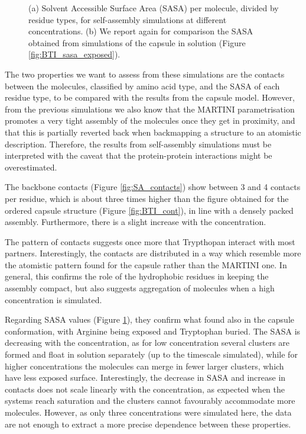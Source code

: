 \begin{figure}
\caption[Self-assembly simulations: SASA]{(a) Solvent Accessible Surface Area (SASA) per molecule, divided by residue types, for self-assembly simulations at different concentrations. (b) We report again for comparison the SASA obtained from simulations of the capsule in solution (Figure \ref{fig:BTI_sasa_exposed}).}
\label{fig:SA_sasa_all}
\end{figure}

The two properties we want to assess from these simulations are the contacts between the molecules, classified by amino acid type, and the SASA of each residue type, to be compared with the results from the capsule model. However, from the previous simulations we also know that the MARTINI parametrisation promotes a very tight assembly of the molecules once they get in proximity, and that this is partially reverted back when backmapping a structure to an atomistic description. Therefore, the results from self-assembly simulations must be interpreted with the caveat that the protein-protein interactions might be overestimated.

The backbone contacts (Figure \ref{fig:SA_contacts}) show between 3 and 4 contacts per residue, which is about three times higher than the figure obtained for the ordered capsule structure (Figure \ref{fig:BTI_cont}), in line with a densely packed assembly.
%
Furthermore, there is a slight increase with the concentration.

The pattern of contacts suggests once more that Trypthopan interact with most partners. Interestingly, the contacts are distributed in a way which resemble more the atomistic pattern found for the capsule rather than the MARTINI one. In general, this confirms the role of the hydrophobic residues in keeping the assembly compact, but also suggests aggregation of molecules when a high concentration is simulated.

Regarding SASA values (Figure \ref{fig:SA_sasa_all}), they confirm what found also in the capsule conformation, with Arginine being exposed and Tryptophan buried. The SASA is decreasing with the concentration, as for low concentration several clusters are formed and float in solution separately (up to the timescale simulated), while for higher concentrations the molecules can merge in fewer larger clusters, which have less exposed surface.
%
Interestingly, the decrease in SASA and increase in contacts does not scale linearly with the concentration, as expected when the systems reach saturation and the clusters cannot favourably accommodate more molecules. However, as only three concentrations were simulated here, the data are not enough to extract a more precise dependence between these properties.

